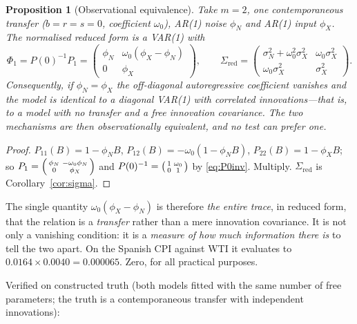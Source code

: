 \documentclass[11pt,a4paper]{article}
\theoremstyle{plain}
\newtheorem{proposition}{Proposition}
\theoremstyle{remark}
\begin{document}
\begin{proposition}[Observational equivalence]
\label{prop:ident}
Take $m=2$, one contemporaneous transfer ($b=r=s=0$, coefficient $\omega_0$), AR(1)
noise $\phi_N$ and AR(1) input $\phi_X$. The normalised reduced form is a VAR(1) with
\begin{equation}
\Phi_1 = P(0)^{-1}P_1
       = \begin{pmatrix}\phi_N & \omega_0(\phi_X-\phi_N)\\[2pt] 0 & \phi_X\end{pmatrix},
\qquad
\Sigma_{\mathrm{red}}=\begin{pmatrix}\sigma_N^2+\omega_0^2\sigma_X^2 & \omega_0\sigma_X^2\\[2pt]
\omega_0\sigma_X^2 & \sigma_X^2\end{pmatrix}.
\label{eq:ident}
\end{equation}
Consequently, if $\phi_N=\phi_X$ the off-diagonal autoregressive coefficient
vanishes and the model is \emph{identical} to a diagonal VAR(1) with correlated
innovations---that is, to a model with \emph{no} transfer and a free innovation
covariance. The two mechanisms are then observationally equivalent, and no test can
prefer one.
\end{proposition}

\begin{proof}
$P_{11}(B)=1-\phi_NB$, $P_{12}(B)=-\omega_0(1-\phi_NB)$, $P_{22}(B)=1-\phi_XB$;
so $P_1=\begin{psmallmatrix}\phi_N & -\omega_0\phi_N\\ 0 & \phi_X\end{psmallmatrix}$
and $P(0)^{-1}=\begin{psmallmatrix}1&\omega_0\\0&1\end{psmallmatrix}$ by
\eqref{eq:P0inv}. Multiply. $\Sigma_{\mathrm{red}}$ is
Corollary~\ref{cor:sigma}.
\end{proof}

The single quantity $\omega_0(\phi_X-\phi_N)$ is therefore \emph{the entire trace},
in reduced form, that the relation is a \emph{transfer} rather than a mere innovation
covariance. It is not only a vanishing condition: it is a \emph{measure of how much
information there is} to tell the two apart. On the Spanish CPI against WTI it
evaluates to $0.0164\times0.0040=0.000065$. Zero, for all practical purposes.

Verified on constructed truth (both models fitted with the same number of free
parameters; the truth is a contemporaneous transfer with independent innovations):
\end{document}
